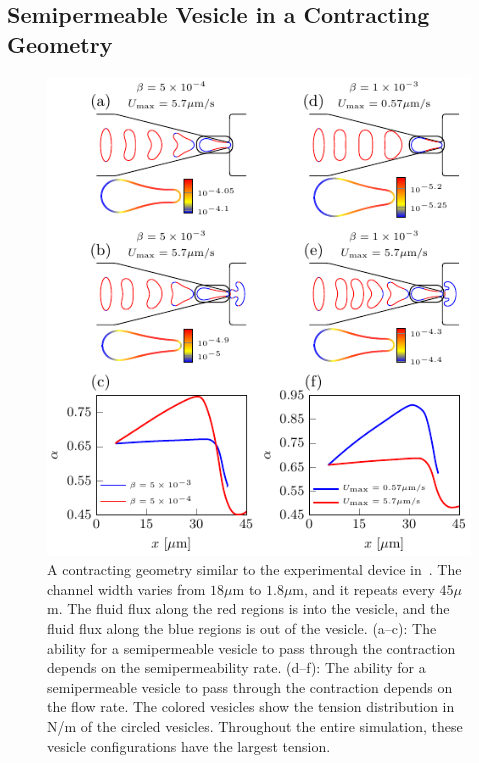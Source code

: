 \documentclass[9pt,twocolumn,twoside,lineno]{pnas-new}
\newif\ifTikz
\begin{document}
\subsection*{Semipermeable Vesicle in a Contracting Geometry} 
\begin{figure}[htp]
  \centering
  \ifTikz
  
  \else
  \includegraphics{figures/contractingComposite.pdf}
  \fi
  \caption{\label{fig:contractingComposite} A contracting geometry
  similar to the experimental device in~\cite{wu2015critical}. The
  channel width varies from $18\mu$m to $1.8\mu$m, and it repeats every
  $45\mu$m. The fluid flux along the red regions is into the vesicle,
  and the fluid flux along the blue regions is out of the vesicle.
  (a--c): The ability for a semipermeable vesicle to pass through the
  contraction depends on the semipermeability rate. (d--f): The ability
  for a semipermeable vesicle to pass through the contraction depends
  on the flow rate. The colored vesicles show the tension distribution
  in N/m of the circled vesicles. Throughout the entire simulation,
  these vesicle configurations have the largest tension.}
\end{figure}
\end{document}

